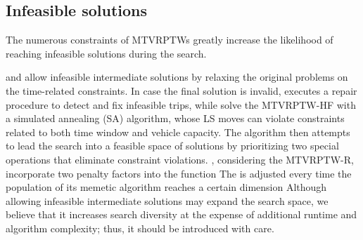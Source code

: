 \subsection{Infeasible solutions}
The numerous constraints of MTVRPTWs greatly increase the likelihood of reaching infeasible solutions during the search.   \newline

\cite{cattaruzza2014iterated} and \cite{franccois2019adaptive} allow infeasible intermediate solutions by relaxing the original problems on the time-related constraints.  In case the final solution is invalid, \cite{cattaruzza2014iterated} executes a repair procedure to detect and fix infeasible trips, while \cite{franccois2019adaptive} %
  \cite{despaux2016multi} solve the MTVRPTW-HF with a simulated annealing (SA) algorithm, whose LS moves can violate constraints related to both time window and vehicle capacity.  The algorithm then attempts to lead the search into a feasible space of solutions by prioritizing two special operations that eliminate constraint violations.      \cite{cattaruzza2016multi}, considering the MTVRPTW-R, incorporate two penalty factors into the  function   The  is adjusted every time the population of its memetic algorithm reaches a certain dimension 
  Although allowing infeasible intermediate solutions may expand the search space, we believe that it increases search diversity at the expense of additional runtime and algorithm complexity; thus, it should be introduced with care.

